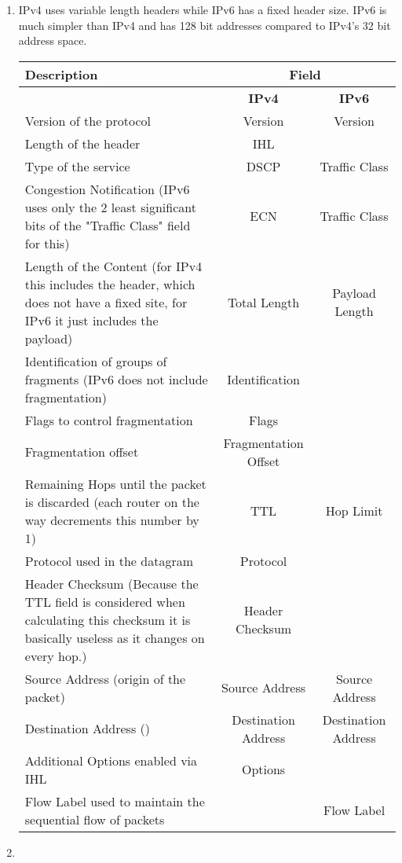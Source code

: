 \documentclass[12pt, a4paper]{article}
\begin{document}
\section{} %

\section{} %
\begin{enumerate}[1]
	\item %
	IPv4 uses variable length headers while IPv6 has a fixed header size. IPv6 is much simpler than IPv4 and has 128 bit addresses compared to IPv4's 32 bit address space.

	\begin{tabular}{|p{18em}|c|c|}
		\hline
		\textbf{Description} & \multicolumn{2}{|c|}{\textbf{Field}}\\\hline
		& \textbf{IPv4} & \textbf{IPv6}\\\hline
		Version of the protocol & Version & Version\\\hline
		Length of the header & IHL &\\\hline
		Type of the service & DSCP & Traffic Class\\\hline
		Congestion Notification (IPv6 uses only the 2 least significant bits of the "Traffic Class" field for this) & ECN & Traffic Class\\\hline
		Length of the Content (for IPv4 this includes the header, which does not have a fixed site, for IPv6 it just includes the payload) & Total Length & Payload Length\\\hline
		Identification of groups of fragments (IPv6 does not include fragmentation) & Identification &\\\hline
		Flags to control fragmentation & Flags &\\\hline
		Fragmentation offset & Fragmentation Offset &\\\hline
		Remaining Hops until the packet is discarded (each router on the way decrements this number by 1) & TTL & Hop Limit\\\hline
		Protocol used in the datagram & Protocol &\\\hline
		Header Checksum (Because the TTL field is considered when calculating this checksum it is basically useless as it changes on every hop.) & Header Checksum &\\\hline
		Source Address (origin of the packet) & Source Address & Source Address\\\hline
		Destination Address () & Destination Address & Destination Address\\\hline
		Additional Options enabled via IHL & Options &\\\hline
		Flow Label used to maintain the sequential flow of packets && Flow Label\\\hline
	\end{tabular}

	\item %
\end{enumerate}
\end{document}
